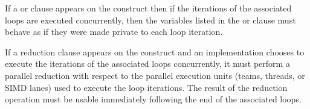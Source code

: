 
If a  or  clause appears on the
 construct then if the iterations of the associated loops are
executed concurrently, then the variables listed in the  or
 clause must behave as if they were made private to each
loop iteration.

If a reduction clause appears on the  construct and an
implementation chooses to execute the iterations of the associated loops
concurrently, it must perform a parallel reduction with respect to the parallel
execution units (teams, threads, or SIMD lanes) used to execute the loop
iterations. The result of the reduction operation must be usable immediately
following the end of the associated loops.

